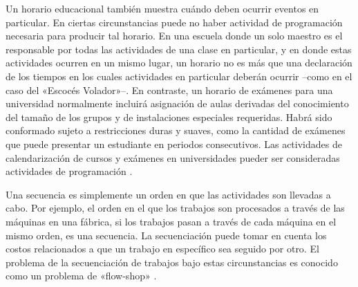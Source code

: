 \documentclass[draft,12pt,headsepline,footsepline,paper=letter]{scrreprt}
\begin{document}
Un horario educacional también muestra cuándo deben ocurrir eventos en particular. En ciertas circunstancias puede no haber actividad de programación necesaria para producir tal horario. En una escuela donde un solo maestro es el responsable por todas las actividades de una clase en particular, y en donde estas actividades ocurren en un mismo lugar, un horario no es más que una declaración de los tiempos en los cuales actividades en particular deberán ocurrir –como en el caso del «Escocés Volador»–. En contraste, un horario de exámenes para una universidad normalmente incluirá asignación de aulas derivadas del conocimiento del tamaño de los grupos y de instalaciones especiales requeridas. Habrá sido conformado sujeto a restricciones duras y suaves, como la cantidad de exámenes que puede presentar un estudiante en periodos consecutivos. Las actividades de calendarización de cursos y exámenes en universidades pueder ser consideradas actividades de programación \citep[p.~49]{wren95scheduling-timetabling}.

Una secuencia es simplemente un orden en que las actividades son llevadas a cabo. Por ejemplo, el orden en el que los trabajos son procesados a través de las máquinas en una fábrica, si los trabajos pasan a través de cada máquina en el mismo orden, es una secuencia. La secuenciación puede tomar en cuenta los costos relacionados a que un trabajo en específico sea seguido por otro. El problema de la secuenciación de trabajos bajo estas circunstancias es conocido como un problema de «flow-shop» \citep[p.~49]{wren95scheduling-timetabling}.
\end{document}

